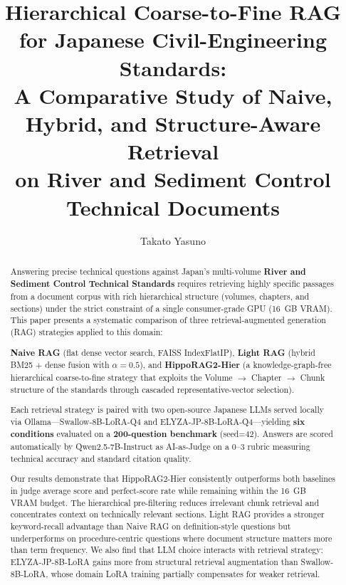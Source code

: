 \documentclass[twocolumn]{article}
\title{Hierarchical Coarse-to-Fine RAG for Japanese Civil-Engineering Standards:\\
A Comparative Study of Naive, Hybrid, and Structure-Aware Retrieval\\
on River and Sediment Control Technical Documents}
\author[1]{Takato Yasuno}
\date{}
\begin{document}
\maketitle

\begin{abstract}

Answering precise technical questions against Japan's multi-volume
\textbf{River and Sediment Control Technical Standards} requires retrieving
highly specific passages from a document corpus with rich hierarchical structure
(volumes, chapters, and sections) under the strict constraint of a single
consumer-grade GPU (16~GB VRAM).
This paper presents a systematic comparison of three retrieval-augmented generation (RAG)
strategies applied to this domain:

\noindent\textbf{Naive RAG} (flat dense vector search, FAISS IndexFlatIP),
\textbf{Light RAG} (hybrid BM25 + dense fusion with $\alpha = 0.5$), and
\textbf{HippoRAG2-Hier} (a knowledge-graph-free hierarchical coarse-to-fine strategy
that exploits the Volume $\to$ Chapter $\to$ Chunk structure of the standards through
cascaded representative-vector selection).

Each retrieval strategy is paired with two open-source Japanese LLMs
served locally via Ollama---Swallow-8B-LoRA-Q4 and ELYZA-JP-8B-LoRA-Q4---yielding
\textbf{six conditions} evaluated on a \textbf{200-question benchmark} (seed=42).
Answers are scored automatically by Qwen2.5-7B-Instruct as AI-as-Judge
on a 0--3 rubric measuring technical accuracy and standard citation quality.

Our results demonstrate that HippoRAG2-Hier consistently outperforms both baselines
in judge average score and perfect-score rate while remaining within the 16~GB VRAM
budget. The hierarchical pre-filtering reduces irrelevant chunk retrieval
and concentrates context on technically relevant sections.
Light RAG provides a stronger keyword-recall advantage than Naive RAG on
definition-style questions but underperforms on procedure-centric questions
where document structure matters more than term frequency.
We also find that LLM choice interacts with retrieval strategy:
ELYZA-JP-8B-LoRA gains more from structural retrieval augmentation than
Swallow-8B-LoRA, whose domain LoRA training partially compensates for
weaker retrieval.

\end{abstract}
\end{document}
